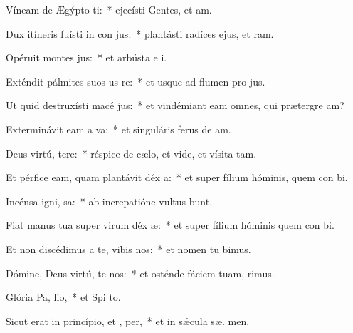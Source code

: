 \item Víneam de Ægýpto ti:~* ejecísti Gentes, et  am.
\item Dux itíneris fuísti in con jus:~* plantásti radíces ejus, et  ram.
\item Opéruit montes  jus:~* et arbústa e  i.
\item Exténdit pálmites suos us  re:~* et usque ad flumen pro jus.
\item Ut quid destruxísti macé jus:~* et vindémiant eam omnes, qui prætergre am?
\item Exterminávit eam a  va:~* et singuláris ferus de  am.
\item Deus virtú, tere:~* réspice de cælo, et vide, et vísita  tam.
\item Et pérfice eam, quam plantávit déx a:~* et super fílium hóminis, quem con bi.
\item Incénsa igni,  sa:~* ab increpatióne vultus  bunt.
\item Fiat manus tua super virum déx æ:~* et super fílium hóminis quem con bi.
\item Et non discédimus a te, vibis nos:~* et nomen tu bimus.
\item Dómine, Deus virtú, te nos:~* et osténde fáciem tuam,   rimus.
\item Glória Pa,  lio,~* et Spi to.
\item Sicut erat in princípio, et ,  per,~* et in sǽcula sæ. men.
